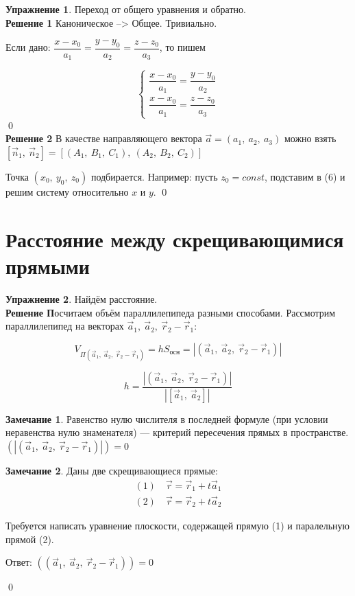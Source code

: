 \documentclass{article}
\theoremstyle{definition}
\newtheorem{exercise}{Упражнение}
\newtheorem{remark}{Замечание}
\newenvironment{solution}[1]{\textbf{\\ Решение #1}}{\qed}
\begin{document}
\begin{exercise}
Переход от общего уравнения и обратно.
\begin{solution}{1}
Каноническое --> Общее. Тривиально.

Если дано: $\dfrac{x - x_0}{a_1} = \dfrac{y - y_0}{a_2} = \dfrac{z - z_0}{a_3}$, то пишем

$$\begin{cases}
\dfrac{x - x_0}{a_1} = \dfrac{y - y_0}{a_2} \\
\dfrac{x - x_0}{a_1} = \dfrac{z - z_0}{a_3}
\end{cases}$$
\end{solution}
\begin{solution}{2}
В качестве направляющего вектора $\vec a = (a_1,\ a_2,\ a_3)$ можно взять $[\vec n_1,\ \vec n_2] = \left[\left(A_1,\ B_1,\ C_1\right),\ \left(A_2,\ B_2,\ C_2\right) \right]$

Точка $(x_0,\ y_0,\ z_0)$ подбирается. Например: пусть $z_0 = const$, подставим в (6) и решим систему относительно $x$ и $y$.
\end{solution}
\end{exercise}

\section{Расстояние между скрещивающимися прямыми}

\begin{exercise}
Найдём расстояние.
\begin{solution}
Посчитаем объём параллилепипеда разными способами. Рассмотрим параллилепипед на векторах $\vec a_1,\ \vec a_2,\ \vec r_2 - \vec r_1$:

$$V_{\Pi(\vec a_1,\ \vec a_2,\ \vec r_2 - \vec r_1)} = hS_{\textrm{осн}} = \left|(\vec a_1,\ \vec a_2,\ \vec r_2 - \vec r_1)\right|$$

$$h = \dfrac{\left|(\vec a_1,\ \vec a_2,\ \vec r_2 - \vec r_1)\right|}{\left|[\vec a_1,\ \vec a_2]\right|}$$

\begin{remark}
Равенство нулю числителя в последней формуле (при условии неравенства нулю знаменателя) --- критерий пересечения прямых в пространстве.
$(\left|(\vec a_1,\ \vec a_2,\ \vec r_2 - \vec r_1)\right|) = 0$
\end{remark}

\begin{remark}
Даны две скрещивающиеся прямые:
$$\begin{matrix}
(1)\quad \vec r = \vec r_1 + t\vec a_1\\
(2)\quad \vec r = \vec r_2 + t\vec a_2
\end{matrix}$$

Требуется написать уравнение плоскости, содержащей прямую (1) и паралельную прямой (2).

Ответ: $((\vec a_1,\ \vec a_2,\ \vec r_2 - \vec r_1)) = 0$
\end{remark}
\end{solution}
\end{exercise}
\end{document}

